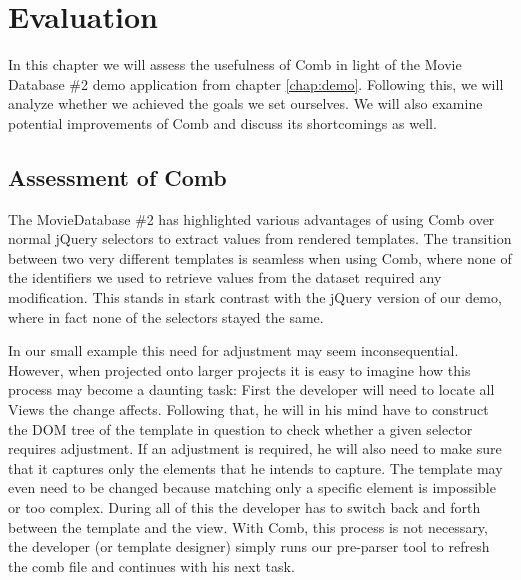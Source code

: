 \documentclass[thesis.tex]{subfiles}
\begin{document}
\chapter{Evaluation}
\label{chap:eval}

In this chapter we will assess the usefulness of Comb in light of the
Movie Database \#2 demo application from chapter \ref{chap:demo}.
Following this, we will analyze whether we achieved the goals we set ourselves.
We will also examine potential improvements of Comb and discuss its shortcomings
as well.




\section{Assessment of Comb}
\label{sec:assessment}
The MovieDatabase \#2 has highlighted various advantages of using Comb over
normal jQuery selectors to extract values from rendered templates.
The transition between two very different templates is seamless when using Comb,
where none of the identifiers we used to retrieve values from the dataset
required any modification. This stands in stark contrast with the jQuery version
of our demo, where in fact none of the selectors stayed the same.

In our small example this need for adjustment may seem inconsequential.
However, when projected onto larger projects it is easy to imagine how this
process may become a daunting task: First the developer will need to locate all
Views the change affects. Following that, he will in his mind have to construct
the DOM tree of the template in question to check whether a given selector
requires adjustment.
If an adjustment is required, he will also need to make sure that
it captures only the elements that he intends to capture.
The template may even need to be changed because matching only a specific
element is impossible or too complex.
During all of this the developer has to switch back and forth between
the template and the view. With Comb, this process is not necessary, the
developer (or template designer) simply runs our pre-parser tool to refresh the
comb file and continues with his next task.
\end{document}
